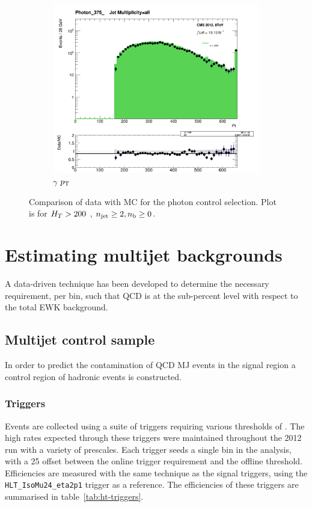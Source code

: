 \begin{figure}[!ht]
  \centering
    \begin{subfigure}[b]{0.48\textwidth}
      \includegraphics[width=\textwidth]{Figs/datamc/pho/Stacked_PhotonPt_all_Photon_375_upwards}
      \caption{$\gamma$ ${p_{\text T}}$}
    \end{subfigure}
    \caption{\label{fig:datamc_pho_inc}
    Comparison of data with MC for the photon control selection. Plot 
    is for $H_T>200$ \gev, $n_{\text{jet}}\geq2, n_{\text{b}}\geq0$.}
\end{figure}

\section{Estimating multijet backgrounds}  %
\label{sec:background_qcd}

A data-driven technique has been 
developed to determine the necessary \alphat requirement, per \HT bin, 
such that QCD is at the sub-percent level with respect to the total EWK 
background.

\subsection{Multijet control sample}
In order to predict the contamination of QCD MJ events in the signal region a 
control region of hadronic events is constructed.

\subsubsection{Triggers}
Events are collected using a suite of triggers requiring various thresholds of 
\HT. The high rates expected through these triggers were maintained throughout 
the 2012 run with a variety of prescales. Each trigger seeds a single \HT bin in
the analysis, with a 25 \gev offset between the online trigger requirement and 
the offline threshold. Efficiencies are measured with the same technique as the
signal triggers, using the \verb!HLT_IsoMu24_eta2p1! trigger as a reference. 
The efficiencies of these triggers are summarised in table~\ref{tab:ht-triggers}.

